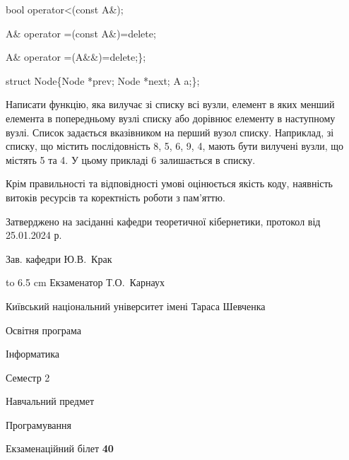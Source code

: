 \documentclass[12pt, ukrainian]{article}
\begin{document}
{\quad  bool operator<(const A\&); 

\quad A\& operator =(const A\&)=delete; 

\quad  A\& operator =(A\&\&)=delete;\};

struct Node\{Node *prev; Node *next; A a;\};

Написати функцію, яка вилучає зі списку всі вузли, елемент в яких менший елемента в попередньому вузлі списку або дорівнює елементу в наступному вузлі. Список задається вказівником на перший вузол списку. Наприклад, зі списку, що містить послідовність 8, 5, 6, 9, 4, мають бути вилучені вузли, що містять 5 та 4. У цьому прикладі 6 залишається в списку.

Крім правильності та відповідності умові оцінюється якість коду, наявність витоків ресурсів та коректність роботи з пам'яттю. 

}
{\smallskip\smallskip \begin {scriptsize} Затверджено на засіданні кафедри теоретичної кібернетики, протокол   від   25.01.2024 р.\par\smallskip\smallskip\smallskip\smallskip
{\parbox {6.5 cm} {Зав. кафедри \dotfill Ю.В.~Крак}}\hspace {0.7cm} {\hbox to 6.5 cm { Екзаменатор \dotfill Т.О.~Карнаух}} \end{scriptsize}}
\newpage
{{\begin {scriptsize}\par
{ \center  Київський національний університет імені Тараса Шевченка \par}
{\parbox {5 cm}{Освітня програма \hfill}{\parbox {7 cm}{Інформатика\hfill}}\parbox {6 cm}{\hfill Семестр 2}}\par
{\parbox {5 cm} {Навчальний предмет \hfill}\parbox {7 cm}{Програмування \hfill}\parbox {6cm}{\hfill}\par}\vspace{-15pt} \end{scriptsize}}{\center Екзаменаційний білет \No \textbf { 40 }\par}}
\end{document}

